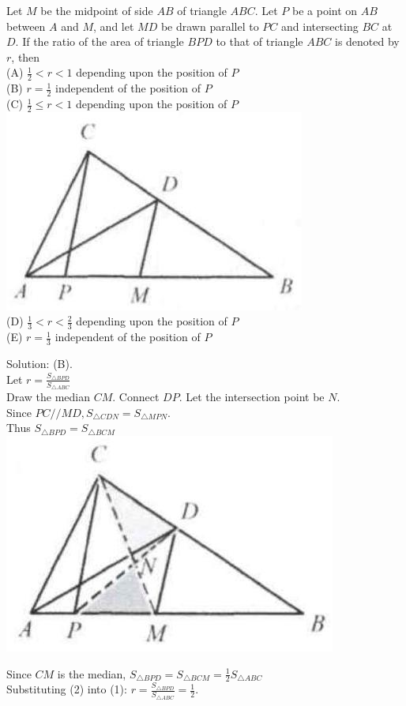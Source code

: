 \documentclass{article}
\begin{document}
Let \(M\) be the midpoint of side \(A B\) of triangle \(A B C\). Let \(P\) be a point on \(A B\) between \(A\) and \(M\), and let \(M D\) be drawn parallel to \(P C\) and intersecting \(B C\) at \(D\). If the ratio of the area of triangle \(B P D\) to that of triangle \(A B C\) is denoted by \(r\), then\\
(A) \(\frac{1}{2}<r<1\) depending upon the position of \(P\)\\
(B) \(r=\frac{1}{2}\) independent of the position of \(P\)\\
(C) \(\frac{1}{2} \leq r<1\) depending upon the position of \(P\)\\
\centering
\includegraphics[width=\textwidth]{images/014(1).jpg}\\
(D) \(\frac{1}{3}<r<\frac{2}{3}\) depending upon the position of \(P\)\\
(E) \(r=\frac{1}{3}\) independent of the position of \(P\)

Solution: (B).\\
Let \(r=\frac{S_{\triangle B P D}}{S_{\triangle A B C}}\)\\
Draw the median \(C M\). Connect \(D P\). Let the intersection point be \(N\).\\
Since \(P C / / M D, S_{\triangle C D N}=S_{\triangle M P N}\).\\
Thus \(S_{\triangle B P D}=S_{\triangle B C M}\)\\
\centering
\includegraphics[width=\textwidth]{images/014.jpg}

Since \(C M\) is the median, \(S_{\triangle B P D}=S_{\triangle B C M}=\frac{1}{2} S_{\triangle A B C}\)\\
Substituting (2) into (1): \(r=\frac{S_{\triangle B P D}}{S_{\triangle A B C}}=\frac{1}{2}\).
\end{document}
